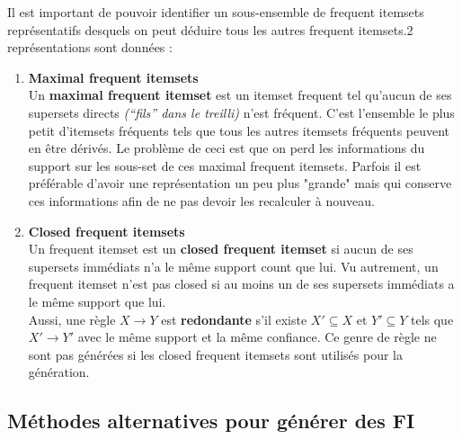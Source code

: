 \documentclass{article}
\begin{document}
\begin{sffamily}
Il est important de pouvoir identifier un sous-ensemble de frequent itemsets représentatifs desquels on peut déduire tous les autres 
frequent itemsets.2 représentations sont données :
\begin{enumerate}
\item \textbf{Maximal frequent itemsets} \\
Un \textbf{maximal frequent itemset} est un itemset frequent tel qu'aucun de ses supersets directs \textit{(``fils'' dans le treilli)} 
n'est fréquent. C'est l'ensemble le plus petit d'itemsets fréquents tels que tous les autres itemsets fréquents peuvent en être dérivés.
Le problème de ceci est que on perd les informations du support sur les sous-set de ces maximal frequent itemsets. Parfois il est 
préférable d'avoir une représentation un peu plus "grande" mais qui	conserve ces informations afin de ne pas devoir les recalculer à 
nouveau.
\item \textbf{Closed frequent itemsets} \\
Un frequent itemset est un \textbf{closed frequent itemset} si aucun de ses supersets immédiats n'a le même support count que lui. Vu 
autrement, un frequent itemset n'est pas closed si au moins un de ses supersets immédiats a le même support que lui.\\
Aussi, une règle $X\rightarrow Y$ est \textbf{redondante} s'il existe $X'\subseteq X$ et $Y'\subseteq Y$ tels que $X'\rightarrow Y'$ avec 
le même support et la même confiance. Ce genre de règle ne sont pas générées si les closed frequent itemsets sont utilisés pour la 
génération.
\end{enumerate}

\subsection{Méthodes alternatives pour générer des FI}


\end{sffamily}
\end{document}
